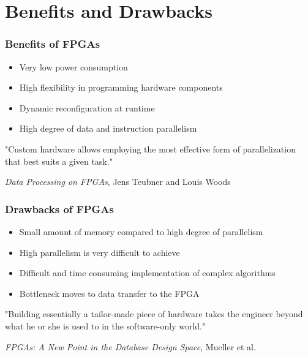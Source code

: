 \documentclass{beamer}
\begin{document}
\section{Benefits and Drawbacks}
\begin{frame}
	\frametitle{Benefits of FPGAs}
	\begin{itemize}
		\item Very low power consumption
		\item High flexibility in programming hardware components
		\item Dynamic reconfiguration at runtime
		\item High degree of data and instruction parallelism
	\end{itemize}
	\vspace*{0.3cm}
	\begin{center}
		"Custom hardware allows employing the most effective form of parallelization that best suits a given task."
	\end{center}
	\vspace*{0.1cm}
	\begin{center}
		\small \emph{Data Processing on FPGAs}, Jens Teubner and Louis Woods 
	\end{center}
\end{frame}

\begin{frame}
\frametitle{Drawbacks of FPGAs}
	\begin{itemize}
		\item Small amount of memory compared to high degree of parallelism
		\item High parallelism is very difficult to achieve
		\item Difficult and time consuming implementation of complex algorithms
		\item Bottleneck moves to data transfer to the FPGA 
	\end{itemize}
	\begin{center}
		"Building essentially a tailor-made piece of hardware takes the engineer beyond what he or she is used to in the software-only world."
	\end{center}
	\begin{center}
		\small \emph{FPGAs: A New Point in the Database Design Space}, Mueller et al.
	\end{center}
\end{frame}
\end{document}
